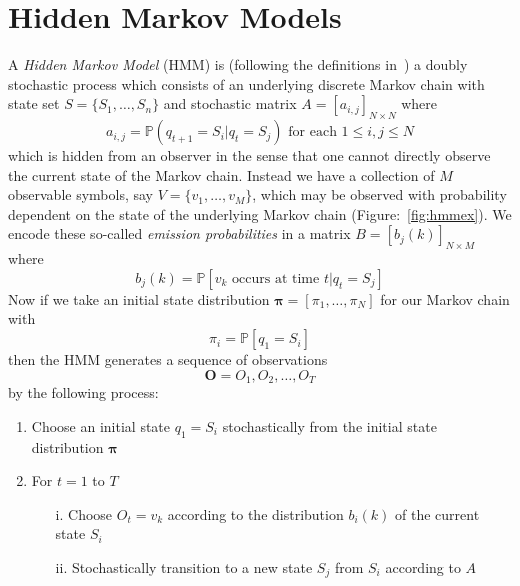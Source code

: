 \section{Hidden Markov Models}
A \emph{Hidden Markov Model} (HMM) is (following the definitions in~\cite{rabiner1989tutorial}) a doubly stochastic process which consists of an underlying discrete Markov chain with state set $S = \{S_1, \dots, S_n \}$ and stochastic matrix $A=[a_{i,j}]_{N\times N}$ where 
\begin{equation*}
a_{i,j} = \mathbb{P}(q_{t+1} = S_i | q_t = S_j) \text{  for each  } 1 \leq i,j \leq N
\end{equation*}
which is hidden from an observer in the sense that one cannot directly observe the current state of the Markov chain. Instead we have a collection of $M$ observable symbols, say $V = \{ v_1, \dots, v_M\}$, which may be observed with probability dependent on the state of the underlying Markov chain (Figure:~\ref{fig:hmmex}). We encode these so-called \emph{emission probabilities} in a matrix $B = [b_j(k)]_{N\times M}$ where
\begin{equation*}
b_j(k) = \mathbb{P}[v_k \text{ occurs at time }t | q_t = S_j] 
\end{equation*}
Now if we take an initial state distribution $\bm{\pi} = [\pi_1, \dots, \pi_N]$ for our Markov chain with
\begin{equation*}
\pi_i= \mathbb{P}[q_1 = S_i]
\end{equation*}
then the HMM generates a sequence of observations
\begin{equation*}
\bm{O} = O_1, O_2, \ldots , O_T
\end{equation*}
by the following process:
\begin{enumerate}
\item Choose an initial state $q_1 = S_i$ stochastically from the initial state distribution $\bm{\pi}$
\item For $t=1$ to $T$
\begin{enumerate}
\item[i.] Choose $O_t = v_k$ according to the distribution $b_i(k)$ of the current state $S_i$
\item[ii.] Stochastically transition to a new state $S_j$ from $S_i$ according to $A$ 
\end{enumerate}
\end{enumerate}

